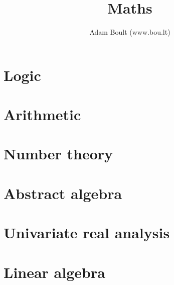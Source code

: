 \documentclass[oneside]{book}
\begin{document}
\author{Adam Boult (www.bou.lt)}
\title{Maths}
\maketitle

\setcounter{tocdepth}{1}
\tableofcontents



\part{Logic}






\part{Arithmetic}






\part{Number theory}















\part{Abstract algebra}




\part{Univariate real analysis}











\part{Linear algebra}








\end{document}
